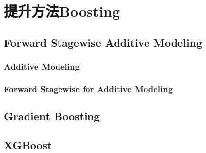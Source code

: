 \chapter{提升方法Boosting}

\section{Forward Stagewise Additive Modeling}

\subsection{Additive Modeling}

\subsection{Forward Stagewise for Additive Modeling}

\section{Gradient Boosting}

\section{XGBoost}